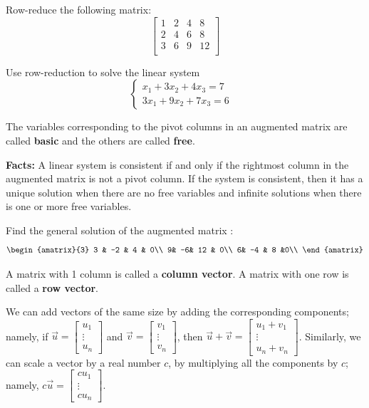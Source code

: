 \documentclass[12pt,letterpaper]{article}
\begin{document}
\begin{enumerate}
\Problem Row-reduce the following matrix:
$$\begin{bmatrix}
1 & 2 & 4 & 8\\
2 & 4 & 6 & 8\\
3 & 6 & 9 & 12\\
\end{bmatrix}$$

\vfill 

\Problem Use row-reduction to solve the linear system
$$\begin{cases}
x_1+3x_2+4x_3 =7&\\
3x_1 +9x_2 +7x_3=6&
\end{cases}$$

\vfill

\newpage

\begin{defn}
The variables corresponding to the pivot columns in an augmented matrix are called {\bf basic} and the others are called {\bf free}.
\end{defn}




{\bf Facts:} A linear system is consistent if and only if the rightmost column in the augmented matrix is not a pivot column. If the system is consistent, then it has a unique solution when there are no free variables and infinite solutions when there is one or more free variables.

\Problem Find the general solution of the augmented matrix :
$$\begin{amatrix}{3}
3 & -2 & 4 & 0\\
9& -6& 12 & 0\\
6& -4 & 8 &0\\
\end{amatrix}$$

\newpage

\begin{defn}
A matrix with 1 column is called a {\bf column vector}. A matrix with one row is called a {\bf row vector}.
\end{defn}

We can add vectors of the same size by adding the corresponding components; namely,
if $\vec{u}=\begin{bmatrix} u_1\\ \vdots\\ u_n \end{bmatrix}$ and  $\vec{v}=\begin{bmatrix} v_1\\ \vdots\\ v_n \end{bmatrix}$, then $\vec{u}+\vec{v} =\begin{bmatrix} u_1+v_1\\ \vdots\\ u_n+v_n \end{bmatrix}$. Similarly, we can scale a vector by a real number $c$, by multiplying all the components by $c$; namely, $c\vec{u}=\begin{bmatrix} cu_1\\ \vdots\\ cu_n \end{bmatrix}$.


\end{enumerate}
\end{document}
